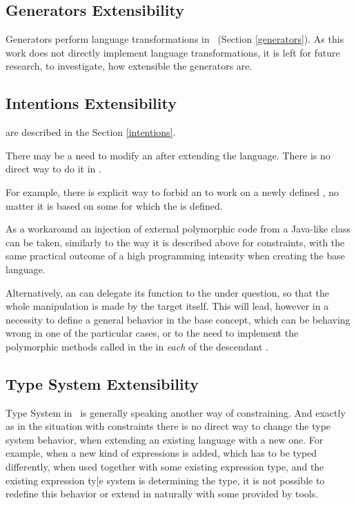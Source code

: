 \subsection{Generators Extensibility}

Generators perform language transformations in \jbmps\ (Section \ref{generators}). As this work does not directly 
implement language transformations, it is left for future research, to investigate, how extensible the 
generators are. 

\subsection{Intentions Extensibility}

 are described in the Section \ref{intentions}. 

There may be a need to modify an  after extending the language. There is no direct way to do it 
in \jbmps. 

For example, there is explicit way to forbid an  to work on a newly defined , no matter
it is based on some  for which the  is defined.

As a workaround an injection of external polymorphic code from a Java-like class can be taken, similarly to the way it is 
described above for constraints, with the same practical outcome of a high programming intensity when creating the base language.

Alternatively, an  can delegate its function to the  under question, so that the whole manipulation is 
made by the target  itself. This will lead, however in a necessity to define a general behavior in the base concept, which can
be behaving wrong in one of the particular cases, or to the need to implement the polymorphic methods called in the  in 
\emph{each} of the descendant .

\subsection{Type System Extensibility}

Type System in \jbmps\ is generally speaking another way of constraining. And exactly as in the situation with constraints 
there is no direct way to change the type system behavior, when extending an existing language with a new one. For example, 
when a new kind of expressions is added, which has to be typed differently, when used together with some existing expression type,
and the existing expression ty[e system is determining the type, it is not possible to redefine this behavior or extend in
naturally with some provided by \jbmps tools.

